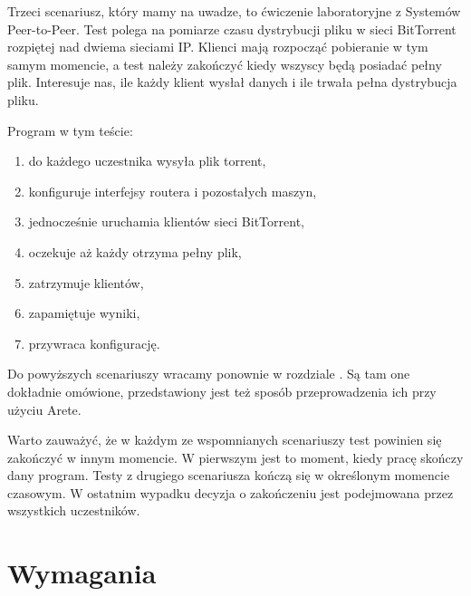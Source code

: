 \documentclass[00-praca-magisterska.tex]{subfiles}
\begin{document}
Trzeci scenariusz, który mamy na uwadze, to ćwiczenie laboratoryjne z Systemów
Peer-to-Peer. Test polega na pomiarze czasu dystrybucji pliku w sieci
BitTorrent rozpiętej nad dwiema sieciami IP. Klienci mają rozpocząć pobieranie
w tym samym momencie, a test należy zakończyć kiedy wszyscy będą posiadać pełny
plik. Interesuje nas, ile każdy klient wysłał danych i ile trwała pełna
dystrybucja pliku.

Program w tym teście:
\begin{enumerate}
\item do każdego uczestnika wysyła plik torrent,
\item konfiguruje interfejsy routera i pozostałych maszyn,
\item jednocześnie uruchamia klientów sieci BitTorrent,
\item oczekuje aż każdy otrzyma pełny plik,
\item zatrzymuje klientów,
\item zapamiętuje wyniki,
\item przywraca konfigurację.
\end{enumerate}

Do powyższych scenariuszy wracamy ponownie w rozdziale . Są
tam one dokładnie omówione, przedstawiony jest też sposób przeprowadzenia ich
przy użyciu Arete.

Warto zauważyć, że w każdym ze wspomnianych scenariuszy test powinien się
zakończyć w innym momencie. W pierwszym jest to moment, kiedy pracę skończy
dany program. Testy z drugiego scenariusza kończą się w określonym momencie
czasowym. W ostatnim wypadku decyzja o zakończeniu jest podejmowana przez
wszystkich uczestników.

\section{Wymagania}
\label{arete-wymagania}
\end{document}
